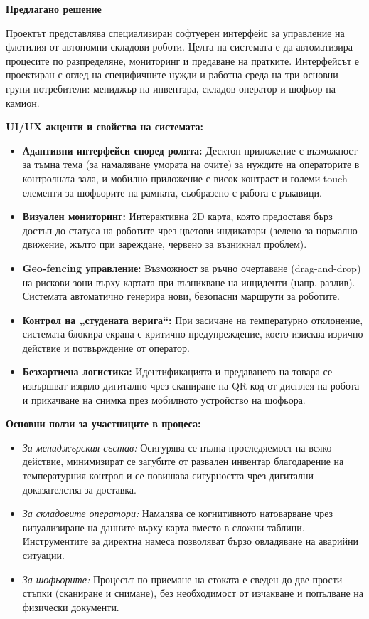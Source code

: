 \documentclass[12pt, a4paper]{article}
\begin{document}
\bigskip
\noindent\textbf{Предлагано решение}

Проектът представлява специализиран софтуерен интерфейс за управление на флотилия от автономни складови роботи. Целта на системата е да автоматизира процесите по разпределяне, мониторинг и предаване на пратките. Интерфейсът е проектиран с оглед на специфичните нужди и работна среда на три основни групи потребители: мениджър на инвентара, складов оператор и шофьор на камион.

\bigskip
\noindent\textbf{UI/UX акценти и свойства на системата:}
\begin{itemize}
    \item \textbf{Адаптивни интерфейси според ролята:} Десктоп приложение с възможност за тъмна тема (за намаляване умората на очите) за нуждите на операторите в контролната зала, и мобилно приложение с висок контраст и големи touch-елементи за шофьорите на рампата, съобразено с работа с ръкавици.
    \item \textbf{Визуален мониторинг:} Интерактивна 2D карта, която предоставя бърз достъп до статуса на роботите чрез цветови индикатори (зелено за нормално движение, жълто при зареждане, червено за възникнал проблем).
    \item \textbf{Geo-fencing управление:} Възможност за ръчно очертаване (drag-and-drop) на рискови зони върху картата при възникване на инциденти (напр. разлив). Системата автоматично генерира нови, безопасни маршрути за роботите.
    \item \textbf{Контрол на „студената верига“:} При засичане на температурно отклонение, системата блокира екрана с критично предупреждение, което изисква изрично действие и потвърждение от оператор.
    \item \textbf{Безхартиена логистика:} Идентификацията и предаването на товара се извършват изцяло дигитално чрез сканиране на QR код от дисплея на робота и прикачване на снимка през мобилното устройство на шофьора.
\end{itemize}

\bigskip
\noindent\textbf{Основни ползи за участниците в процеса:}

\begin{itemize}
    \item \textit{За мениджърския състав:} Осигурява се пълна проследяемост на всяко действие, минимизират се загубите от развален инвентар благодарение на температурния контрол и се повишава сигурността чрез дигитални доказателства за доставка.
    \item \textit{За складовите оператори:} Намалява се когнитивното натоварване чрез визуализиране на данните върху карта вместо в сложни таблици. Инструментите за директна намеса позволяват бързо овладяване на аварийни ситуации.
    \item \textit{За шофьорите:} Процесът по приемане на стоката е сведен до две прости стъпки (сканиране и снимане), без необходимост от изчакване и попълване на физически документи.
\end{itemize}
\end{document}
